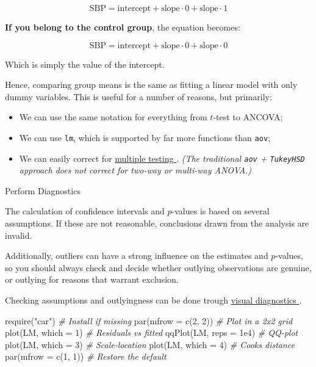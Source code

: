 \documentclass[
]{book}
\newenvironment{Shaded}{\begin{snugshade}}{\end{snugshade}}
\newcommand{\AttributeTok}[1]{\textcolor[rgb]{0.77,0.63,0.00}{#1}}
\newcommand{\CommentTok}[1]{\textcolor[rgb]{0.56,0.35,0.01}{\textit{#1}}}
\newcommand{\DecValTok}[1]{\textcolor[rgb]{0.00,0.00,0.81}{#1}}
\newcommand{\FloatTok}[1]{\textcolor[rgb]{0.00,0.00,0.81}{#1}}
\newcommand{\FunctionTok}[1]{\textcolor[rgb]{0.00,0.00,0.00}{#1}}
\newcommand{\NormalTok}[1]{#1}
\newcommand{\StringTok}[1]{\textcolor[rgb]{0.31,0.60,0.02}{#1}}
\providecommand{\tightlist}{%
  \setlength{\itemsep}{0pt}\setlength{\parskip}{0pt}}
\begin{document}
\[\text{SBP} = \text{intercept} + \text{slope} \cdot 0 + \text{slope} \cdot 1\]

\textbf{If you belong to the control group}, the equation becomes:

\[\text{SBP} = \text{intercept} + \text{slope} \cdot 0 + \text{slope} \cdot 0\]

Which is simply the value of the intercept.

Hence, comparing group means is the same as fitting a linear model with only dummy variables. This is useful for a number of reasons, but primarily:

\begin{itemize}
\tightlist
\item
  We can use the same notation for everything from \(t\)-test to ANCOVA;
\item
  We can use \texttt{lm}, which is supported by far more functions than \texttt{aov};
\item
  We can easily correct for \href{https://youtu.be/RUX94txw4Qo}{multiple testing }. \emph{(The traditional \texttt{aov} + \texttt{TukeyHSD} approach does not correct for two-way or multi-way ANOVA.)}
\end{itemize}

Perform Diagnostics

The calculation of confidence intervals and \(p\)-values is based on several assumptions. If these are not reasonable, conclusions drawn from the analysis are invalid.

Additionally, outliers can have a strong influence on the estimates and \(p\)-values, so you should always check and decide whether outlying observations are genuine, or outlying for reasons that warrant exclusion.

Checking assumptions and outlyingness can be done trough \href{https://youtu.be/upJJmfSbBuQ}{visual diagnostics }.

\begin{Shaded}
\begin{Highlighting}[]
\FunctionTok{require}\NormalTok{(}\StringTok{"car"}\NormalTok{)         }\CommentTok{\# Install if missing}
\FunctionTok{par}\NormalTok{(}\AttributeTok{mfrow =} \FunctionTok{c}\NormalTok{(}\DecValTok{2}\NormalTok{, }\DecValTok{2}\NormalTok{))   }\CommentTok{\# Plot in a 2x2 grid}
\FunctionTok{plot}\NormalTok{(LM, }\AttributeTok{which =} \DecValTok{1}\NormalTok{)    }\CommentTok{\# Residuals vs fitted}
\FunctionTok{qqPlot}\NormalTok{(LM, }\AttributeTok{reps =} \FloatTok{1e4}\NormalTok{) }\CommentTok{\# QQ{-}plot}
\FunctionTok{plot}\NormalTok{(LM, }\AttributeTok{which =} \DecValTok{3}\NormalTok{)    }\CommentTok{\# Scale{-}location}
\FunctionTok{plot}\NormalTok{(LM, }\AttributeTok{which =} \DecValTok{4}\NormalTok{)    }\CommentTok{\# Cook\textquotesingle{}s distance}
\FunctionTok{par}\NormalTok{(}\AttributeTok{mfrow =} \FunctionTok{c}\NormalTok{(}\DecValTok{1}\NormalTok{, }\DecValTok{1}\NormalTok{))   }\CommentTok{\# Restore the default}
\end{Highlighting}
\end{Shaded}
\end{document}
